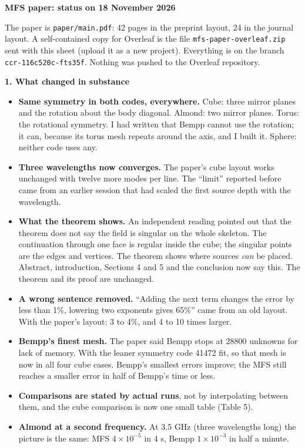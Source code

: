 \documentclass[11pt]{article}
\begin{document}
{\large\bfseries MFS paper: status on 18 November 2026}

The paper is \texttt{paper/main.pdf}: 42 pages in the preprint layout, 24 in the journal layout. A self-contained copy for Overleaf is the file \texttt{mfs-paper-overleaf.zip} sent with this sheet (upload it as a new project). Everything is on the branch \texttt{ccr-116c520c-fts35f}. Nothing was pushed to the Overleaf repository.

\textbf{1. What changed in substance}
\begin{itemize}
\item \textbf{Same symmetry in both codes, everywhere.} Cube: three mirror planes and the rotation about the body diagonal. Almond: two mirror planes. Torus: the rotational symmetry. I had written that Bempp cannot use the rotation; it can, because its torus mesh repeats around the axis, and I built it. Sphere: neither code uses any.
\item \textbf{Three wavelengths now converges.} The paper's cube layout works unchanged with twelve more modes per line. The ``limit'' reported before came from an earlier session that had scaled the first source depth with the wavelength.
\item \textbf{What the theorem shows.} An independent reading pointed out that the theorem does not say the field is singular on the whole skeleton. The continuation through one face is regular inside the cube; the singular points are the edges and vertices. The theorem shows where sources \emph{can} be placed. Abstract, introduction, Sections 4 and 5 and the conclusion now say this. The theorem and its proof are unchanged.
\item \textbf{A wrong sentence removed.} ``Adding the next term changes the error by less than 1\%, lowering two exponents gives 65\%'' came from an old layout. With the paper's layout: 3 to 4\%, and 4 to 10 times larger.
\item \textbf{Bempp's finest mesh.} The paper said Bempp stops at 28800 unknowns for lack of memory. With the leaner symmetry code 41472 fit, so that mesh is now in all four cube cases. Bempp's smallest errors improve; the MFS still reaches a smaller error in half of Bempp's time or less.
\item \textbf{Comparisons are stated by actual runs}, not by interpolating between them, and the cube comparison is now one small table (Table 5).
\item \textbf{Almond at a second frequency.} At 3.5 GHz (three wavelengths long) the picture is the same: MFS $4\times10^{-5}$ in 4 s, Bempp $1\times10^{-3}$ in half a minute.
\end{itemize}
\end{document}
